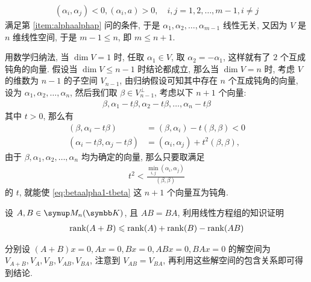 \begin{exercise}[series=exer]
\begin{answer}
\begin{answersheet}
            \begin{align*}
                (\alpha_{i}, \alpha_{j}) < 0, (\alpha_{i}, a) > 0, \quad i, j = 1, 2, \dots, m - 1, i \ne j
            \end{align*}
            满足第 \ref{item:alphaalphap} 问的条件, 于是 $ \alpha_{1}, \alpha_{2}, \dots, \alpha_{m - 1} $ 线性无关, 又因为 $ V $ 是 $ n $ 维线性空间, 于是 $ m - 1 \le n $, 即 $ m \le n + 1 $.
            \item 用数学归纳法, 当 $ \dim V = 1 $ 时, 任取 $ \alpha_{1} \in V $, 取 $ \alpha_{2} = -\alpha_{1} $, 这样就有了 $ 2 $ 个互成钝角的向量. 假设当 $ \dim V \le n - 1 $ 时结论都成立, 那么当 $ \dim V = n $ 时, 考虑 $ V $ 的维数为 $ n - 1 $ 的子空间 $ V_{n - 1} $, 由归纳假设可知其中存在 $ n $ 个互成钝角的向量, 设为 $ \alpha_{1}, \alpha_{2}, \dots, \alpha_{n} $, 然后我们取 $ \beta \in V_{n - 1}^{\bot} $, 考虑以下 $ n + 1 $ 个向量:
            \begin{align}\label{eq:betaalpha1-tbeta}
                \beta, \alpha_{1} - t\beta, \alpha_{2} - t\beta, \dots, \alpha_{n} - t\beta
            \end{align}
            其中 $ t > 0 $, 那么有
            \begin{align*}
                (\beta, \alpha_{i} - t\beta) & = (\beta, \alpha_{i}) - t(\beta, \beta) < 0\\
                (\alpha_{i} - t\beta, \alpha_{j} - t\beta) & = (\alpha_{i}, \alpha_{j}) + t^{2}(\beta, \beta),
            \end{align*}
            由于 $ \beta, \alpha_{1}, \alpha_{2}, \dots, \alpha_{n} $ 均为确定的向量, 那么只要取满足
            \begin{align*}
                t^{2} < \frac{\min_{i, j}(\alpha_{i}, \alpha_{j})}{(\beta, \beta)}
            \end{align*}
            的 $ t $, 就能使 \eqref{eq:betaalpha1-tbeta} 这 $ n + 1 $ 个向量互为钝角.
        \end{answersheet}
    \end{answer}
    \item 设 $ A, B \in \MM[\K] $, 且 $ AB = BA $, 利用线性方程组的知识证明
    \begin{align*}
        \rank(A + B) \leqslant \rank(A) + \rank(B) - \rank(AB)
    \end{align*}
    \begin{hint}
        分别设 $ (A + B)x = 0, Ax = 0, Bx = 0, ABx = 0, BAx = 0 $ 的解空间为 $ V_{A+B}, V_{A}, V_{B}, V_{AB}, V_{BA} $, 注意到 $ V_{AB} = V_{BA} $, 再利用这些解空间的包含关系即可得到结论.

\end{hint}
\end{exercise}
